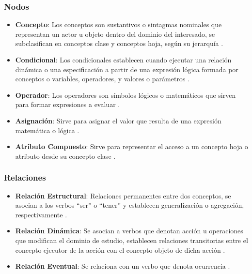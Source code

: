 \subsubsection{Nodos}
\begin{itemize}
	\item \textbf{Concepto}:
	Los conceptos son sustantivos o sintagmas nominales que representan un actor u objeto dentro del dominio del interesado, se subclasifican en conceptos clase y conceptos hoja, según su jerarquía \citep{zapata2007phd,zapata2012unc}. %
	
	\item \textbf{Condicional}: Los condicionales establecen cuando ejecutar una relación dinámica o una especificación a partir de una expresión lógica formada por conceptos o variables, operadores, y valores o parámetros \citep{zapata2007phd,zapata2012unc}. %
	
	\item \textbf{Operador}: Los operadores son símbolos lógicos o matemáticos que sirven para formar expresiones a evaluar \citep{zapata2012unc}.
	
	\item \textbf{Asignación}: Sirve para asignar el valor que resulta de una expresión matemática o lógica \citep{zapata2012unc}.
	
	\item \textbf{Atributo Compuesto}: Sirve para representar el acceso a un concepto hoja o atributo desde su concepto clase \citep{zapata2007phd}.
\end{itemize}

\subsubsection{Relaciones}
\begin{itemize}
	\item \textbf{Relación Estructural}: Relaciones permanentes entre dos conceptos, se asocian a los verbos ``ser'' o ``tener'' y establecen generalización o agregación, respectivamente \citep{zapata2007phd,zapata2012unc}.
	\item \textbf{Relación Dinámica}: Se asocian a verbos que denotan acción u operaciones que modifican el dominio de estudio, establecen relaciones transitorias entre el concepto ejecutor de la acción con el concepto objeto de dicha acción \citep{zapata2007phd,zapata2012unc}.
	\item \textbf{Relación Eventual}: Se relaciona con un verbo que denota ocurrencia \citep{zapata2012unc,norena2018Ling}.
\end{itemize}

